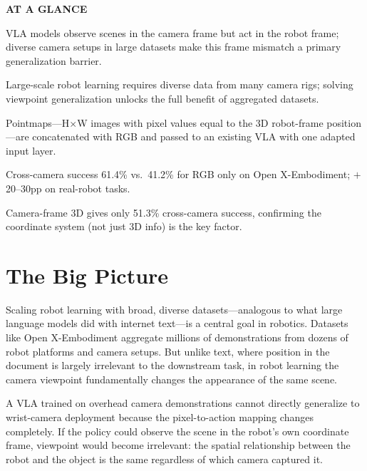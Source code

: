 \documentclass[10pt,twocolumn]{article}
\begin{document}
\begin{mdframed}[backgroundcolor=boxgray,linecolor=rulered,linewidth=1pt,
    innerleftmargin=6pt,innerrightmargin=6pt,
    innertopmargin=6pt,innerbottommargin=6pt]
\textbf{\small AT A GLANCE}\par\vspace{4pt}
\begin{description}[leftmargin=0pt,labelsep=4pt,itemsep=2pt,parsep=0pt,
    font=\small\bfseries]
  \item[Problem:] VLA models observe scenes in the camera frame
    but act in the robot frame; diverse camera setups in large
    datasets make this frame mismatch a primary generalization barrier.
  \item[Why it matters:] Large-scale robot learning requires diverse
    data from many camera rigs; solving viewpoint generalization
    unlocks the full benefit of aggregated datasets.
  \item[Method:] Pointmaps---H$\times$W images with pixel values
    equal to the 3D robot-frame position---are concatenated with RGB
    and passed to an existing VLA with one adapted input layer.
  \item[Result:] Cross-camera success 61.4\% vs.\ 41.2\% for RGB
    only on Open X-Embodiment; $+$20--30pp on real-robot tasks.
  \item[Evidence:] Camera-frame 3D gives only 51.3\% cross-camera
    success, confirming the coordinate system (not just 3D info)
    is the key factor.
\end{description}
\end{mdframed}

\section{The Big Picture}

Scaling robot learning with broad, diverse datasets---analogous to
what large language models did with internet text---is a central goal
in robotics. Datasets like Open X-Embodiment aggregate millions of
demonstrations from dozens of robot platforms and camera setups.
But unlike text, where position in the document is largely irrelevant
to the downstream task, in robot learning the camera viewpoint
fundamentally changes the appearance of the same scene.

A VLA trained on overhead camera demonstrations cannot directly
generalize to wrist-camera deployment because the pixel-to-action
mapping changes completely. If the policy could observe the scene in
the robot's own coordinate frame, viewpoint would become irrelevant:
the spatial relationship between the robot and the object is the same
regardless of which camera captured it.
\end{document}
